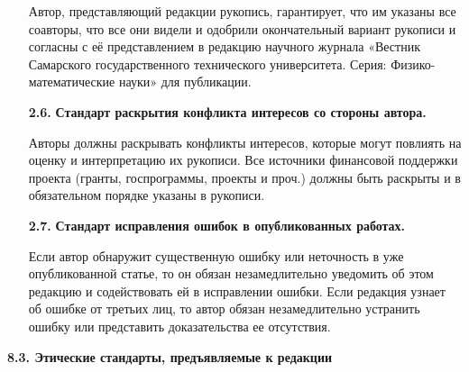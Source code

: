 \begin{enumerate}
Автор, представляющий редакции рукопись, гарантирует, что им указаны все соавторы, что все они видели и одобрили окончательный вариант рукописи и согласны с её представлением в редакцию научного журнала «Вестник Самарского государственного технического университета. Серия: Физико-математические науки» для публикации.



\item[\bf 2.6.] {\bf  Стандарт раскрытия конфликта интересов со стороны автора.}

Авторы должны раскрывать конфликты интересов, которые могут повлиять на оценку и интерпретацию их рукописи. Все источники финансовой поддержки проекта (гранты, госпрограммы, проекты и проч.) должны быть раскрыты и в обязательном порядке указаны в рукописи.



\item[\bf 2.7.] {\bf  Стандарт исправления ошибок в опубликованных работах.}

Если автор обнаружит существенную ошибку или неточность в уже опубликованной статье, то он обязан незамедлительно уведомить об этом редакцию и содействовать ей в исправлении ошибки. Если редакция узнает об ошибке от третьих лиц, то автор обязан незамедлительно устранить ошибку или представить доказательства ее отсутствия.



\end{enumerate}



\smallskip



\noindent

{\bf 8.3. Этические стандарты, предъявляемые к редакции}






